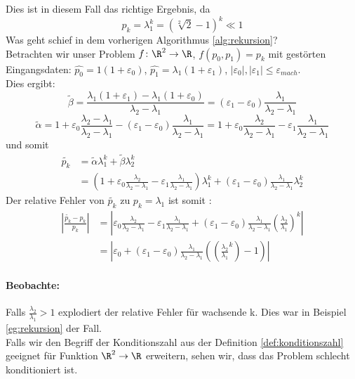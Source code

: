

Dies ist in diesem Fall das richtige Ergebnis, da
\[
p_k=\lambda_1^{k}=(\sqrt[2]{2}-1)^{k} \ll 1 
\]
Was geht schief in dem vorherigen Algorithmus \ref{alg:rekursion}? \\
Betrachten wir unser Problem $f \colon \R^2 \to \R$, $f(p_0,p_1)=p_k$ mit gestörten Eingangsdaten: $\hat{p_0}= 1(1+\varepsilon_0)$, $\hat{p_1}= \lambda_1(1+\varepsilon_1)$, $|\varepsilon_0|, |\varepsilon_1|\le \varepsilon_{mach}$.\\
Dies ergibt:
\[
\tilde{\beta} = \frac{\lambda_1(1+\varepsilon_1)-\lambda_1(1+\varepsilon_0)}{\lambda_2-\lambda_1}= (\varepsilon_1-\varepsilon_0) \frac{\lambda_1}{\lambda_2-\lambda_1}
\]
\[
\tilde{\alpha} = 1+ \varepsilon_0 \frac{\lambda_2-\lambda_1}{\lambda_2-\lambda_1}-(\varepsilon_1-\varepsilon_0) \frac{\lambda_1}{\lambda_2-\lambda_1}= 1+\varepsilon_0 \frac{\lambda_2}{\lambda_2-\lambda_1}- \varepsilon_1 \frac{\lambda_1}{\lambda_2-\lambda_1}
\]
und somit
\begin{align*}
\tilde{p_k} 
&= \tilde{\alpha} \lambda_1^{k}+ \tilde{\beta} \lambda_2^{k}\\
&=(1+\varepsilon_0 \frac{\lambda_2}{\lambda_2-\lambda_1}-\varepsilon_1 \frac{\lambda_1}{\lambda_2-\lambda_1})\lambda_1^{k}+(\varepsilon_1 -\varepsilon_0) \frac{\lambda_1}{\lambda_2-\lambda_1} \lambda_2^{k}
\end{align*}
Der relative Fehler von $\tilde{p_k}$ zu $p_k= \lambda_1$ ist somit :
\begin{align*}
	\left|\frac{\tilde{p_k}-p_k}{p_k} \right|
	&= \left|\varepsilon_0 \frac{\lambda_2}{\lambda_2-\lambda_1} -\varepsilon_1 \frac{\lambda_1}{\lambda_2-\lambda_1} + (\varepsilon_1-\varepsilon_0) \frac{\lambda_1}{\lambda_2-\lambda_1} \left(\frac{\lambda_2}{\lambda_1} \right)^{k}\right| \\
	&= \left| \varepsilon_0 + (\varepsilon_1-\varepsilon_0) \frac{\lambda_1}{\lambda_2-\lambda_1} \left( \left( \frac{\lambda_2}{\lambda_1}^{k} \right)-1 \right) \right|
\end{align*}
\paragraph{Beobachte:}Falls $\frac{\lambda_2}{\lambda_1}>1$ explodiert der relative Fehler für wachsende k. Dies war in Beispiel \ref{eg:rekursion} der Fall. \\
Falls wir den Begriff der Konditionszahl aus der Definition \ref{def:konditionszahl} geeignet für Funktion $\R^2 \to \R$ erweitern, sehen wir, dass das Problem schlecht konditioniert ist.

